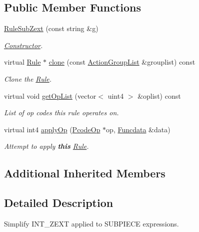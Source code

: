 \subsection*{Public Member Functions}
\begin{DoxyCompactItemize}
\item 
\mbox{\hyperlink{class_rule_sub_zext_a5b130dff249f64556339a226598a9e42}{Rule\+Sub\+Zext}} (const string \&g)
\begin{DoxyCompactList}\small\item\em \mbox{\hyperlink{class_constructor}{Constructor}}. \end{DoxyCompactList}\item 
virtual \mbox{\hyperlink{class_rule}{Rule}} $\ast$ \mbox{\hyperlink{class_rule_sub_zext_af5aa330b8a18e0491fde11acef8fd853}{clone}} (const \mbox{\hyperlink{class_action_group_list}{Action\+Group\+List}} \&grouplist) const
\begin{DoxyCompactList}\small\item\em Clone the \mbox{\hyperlink{class_rule}{Rule}}. \end{DoxyCompactList}\item 
virtual void \mbox{\hyperlink{class_rule_sub_zext_a14a0365fedfc7c277e9387f2622d9c3b}{get\+Op\+List}} (vector$<$ uint4 $>$ \&oplist) const
\begin{DoxyCompactList}\small\item\em List of op codes this rule operates on. \end{DoxyCompactList}\item 
virtual int4 \mbox{\hyperlink{class_rule_sub_zext_abefcd055ea0199a4cf71e5f310996d9b}{apply\+Op}} (\mbox{\hyperlink{class_pcode_op}{Pcode\+Op}} $\ast$op, \mbox{\hyperlink{class_funcdata}{Funcdata}} \&data)
\begin{DoxyCompactList}\small\item\em Attempt to apply {\bfseries{this}} \mbox{\hyperlink{class_rule}{Rule}}. \end{DoxyCompactList}\end{DoxyCompactItemize}
\subsection*{Additional Inherited Members}


\subsection{Detailed Description}
Simplify I\+N\+T\+\_\+\+Z\+E\+XT applied to S\+U\+B\+P\+I\+E\+CE expressions. 

